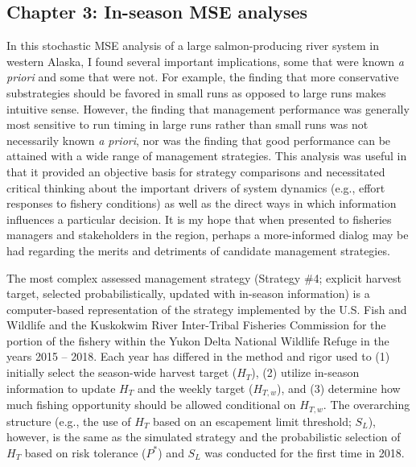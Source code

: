 \documentclass[12pt,]{book}
\theoremstyle{definition}
\theoremstyle{definition}
\theoremstyle{definition}
\theoremstyle{remark}
\begin{document}
\subsection{Chapter 3: In-season MSE
analyses}\label{chapter-3-in-season-mse-analyses}

\noindent
In this stochastic MSE analysis of a large salmon-producing river system
in western Alaska, I found several important implications, some that
were known \emph{a priori} and some that were not. For example, the
finding that more conservative substrategies should be favored in small
runs as opposed to large runs makes intuitive sense. However, the
finding that management performance was generally most sensitive to run
timing in large runs rather than small runs was not necessarily known
\emph{a priori}, nor was the finding that good performance can be
attained with a wide range of management strategies. This analysis was
useful in that it provided an objective basis for strategy comparisons
and necessitated critical thinking about the important drivers of system
dynamics (e.g., effort responses to fishery conditions) as well as the
direct ways in which information influences a particular decision. It is
my hope that when presented to fisheries managers and stakeholders in
the region, perhaps a more-informed dialog may be had regarding the
merits and detriments of candidate management strategies.

The most complex assessed management strategy (Strategy \#4; explicit
harvest target, selected probabilistically, updated with in-season
information) is a computer-based representation of the strategy
implemented by the U.S. Fish and Wildlife and the Kuskokwim River
Inter-Tribal Fisheries Commission for the portion of the fishery within
the Yukon Delta National Wildlife Refuge in the years 2015 -- 2018. Each
year has differed in the method and rigor used to (1) initially select
the season-wide harvest target (\(H_T\)), (2) utilize in-season
information to update \(H_T\) and the weekly target (\(H_{T,w}\)), and
(3) determine how much fishing opportunity should be allowed conditional
on \(H_{T,w}\). The overarching structure (e.g., the use of \(H_T\)
based on an escapement limit threshold; \(S_L\)), however, is the same
as the simulated strategy and the probabilistic selection of \(H_T\)
based on risk tolerance (\(P^*\)) and \(S_L\) was conducted for the
first time in 2018.
\end{document}
